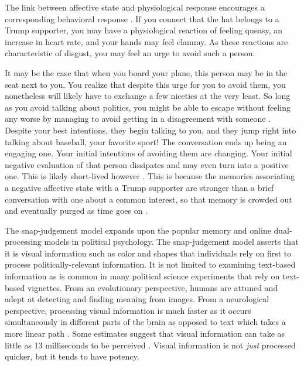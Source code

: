 \documentclass [12pt]{article}
\begin{document}
The link between affective state and physiological response encourages a corresponding behavioral response \citep{valentino_et-al_2011_jop}. If you connect that the hat belongs to a Trump supporter, you may have a physiological reaction of feeling queasy, an increase in heart rate, and your hands may feel clammy. As these reactions are characteristic of disgust, you may feel an urge to avoid such a person. 

It may be the case that when you board your plane, this person may be in the seat next to you. You realize that despite this urge for you to avoid them, you nonetheless will likely have to exchange a few niceties at the very least. So long as you avoid talking about politics, you might be able to escape without feeling any worse by managing to avoid getting in a disagreement with someone \citep{mutz_2006, carlson_settle_2022_cup}. Despite your best intentions, they begin talking to you, and they jump right into talking about baseball, your favorite sport! The conversation ends up being an engaging one. Your initial intentions of avoiding them are changing. Your initial negative evaluation of that person dissipates and may even turn into a positive one. This is likely short-lived however \citep{santoro_broockman_2022_sa}. This is because the memories associating a negative affective state with a Trump supporter are stronger than a brief conversation with one about a common interest, so that memory is crowded out and eventually purged as time goes on \citep{kahana_et-al_2022_ohhum}.


The snap-judgement model expands upon the popular memory and online dual-processing models in political psychology. The snap-judgement model asserts that it is visual information such as color and shapes that individuals rely on first to process politically-relevant information. It is not limited to examining text-based information as is common in many political science experiments that rely on text-based vignettes. From an evolutionary perspective, humans are attuned and adept at detecting and finding meaning from images. From a neurological perspective, processing visual information is much faster as it occurs simultaneously in different parts of the brain as opposed to text which takes a more linear path \citep{vogel_et-al_1986_wp}. Some estimates suggest that visual information can take as little as 13 milliseconds to be perceived \citep{potter_et-al_2014_app}. Visual information is not \textit{just} processed quicker, but it tends to have potency.
\end{document}
